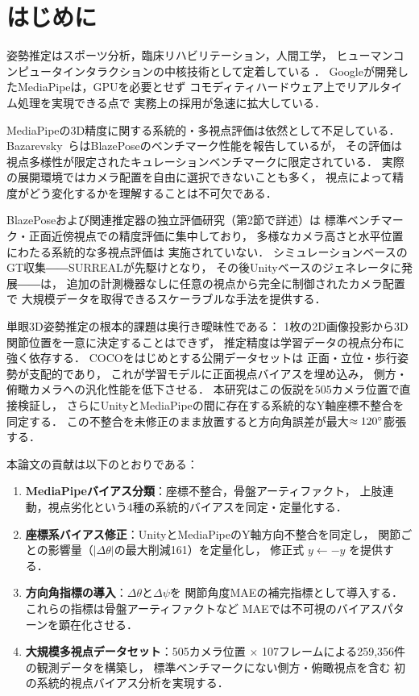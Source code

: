 \documentclass[twocolumn]{article}
\begin{document}
\section{はじめに}

姿勢推定はスポーツ分析，臨床リハビリテーション，人間工学，
ヒューマンコンピュータインタラクションの中核技術として定着している
\cite{mediapipe,blazepose}．
Googleが開発したMediaPipeは，GPUを必要とせず
コモディティハードウェア上でリアルタイム処理を実現できる点で
実務上の採用が急速に拡大している\cite{mediapipe}．

MediaPipeの3D精度に関する系統的・多視点評価は依然として不足している．
Bazarevsky~ら\cite{blazepose}はBlazePoseのベンチマーク性能を報告しているが，
その評価は視点多様性が限定されたキュレーションベンチマークに限定されている．
実際の展開環境ではカメラ配置を自由に選択できないことも多く，
視点によって精度がどう変化するかを理解することは不可欠である．

BlazePoseおよび関連推定器の独立評価研究（第2節で詳述）は
標準ベンチマーク・正面近傍視点での精度評価に集中しており，
多様なカメラ高さと水平位置にわたる系統的な多視点評価は
実施されていない．
シミュレーションベースのGT収集――SURREAL\cite{surreal}が先駆けとなり，
その後Unityベースのジェネレータ\cite{peoplesanspeople}に発展――は，
追加の計測機器なしに任意の視点から完全に制御されたカメラ配置で
大規模データを取得できるスケーラブルな手法を提供する．

単眼3D姿勢推定の根本的課題は奥行き曖昧性である：
1枚の2D画像投影から3D関節位置を一意に決定することはできず，
推定精度は学習データの視点分布に強く依存する\cite{mehta2017}．
COCO\cite{coco}をはじめとする公開データセットは
正面・立位・歩行姿勢が支配的であり，
これが学習モデルに正面視点バイアスを埋め込み，
側方・俯瞰カメラへの汎化性能を低下させる．
本研究はこの仮説を505カメラ位置で直接検証し，
さらにUnityとMediaPipeの間に存在する系統的なY軸座標不整合を同定する．
この不整合を未修正のまま放置すると方向角誤差が最大$\approx120\degree{}$膨張する．

本論文の貢献は以下のとおりである：
\begin{enumerate}\itemsep0pt
  \item \textbf{MediaPipeバイアス分類}：座標不整合，骨盤アーティファクト，
        上肢連動，視点劣化という4種の系統的バイアスを同定・定量化する．
  \item \textbf{座標系バイアス修正}：UnityとMediaPipeのY軸方向不整合を同定し，
        関節ごとの影響量（$|\Delta\theta|$の最大削減161\degree{}）を定量化し，
        修正式 $y \leftarrow -y$ を提供する．
  \item \textbf{方向角指標の導入}：$\Delta\theta$と$\Delta\psi$を
        関節角度MAEの補完指標として導入する．
        これらの指標は骨盤アーティファクトなど
        MAEでは不可視のバイアスパターンを顕在化させる．
  \item \textbf{大規模多視点データセット}：505カメラ位置 $\times$
        107フレームによる259,356件の観測データを構築し，
        標準ベンチマークにない側方・俯瞰視点を含む
        初の系統的視点バイアス分析を実現する．
\end{enumerate}
\end{document}
